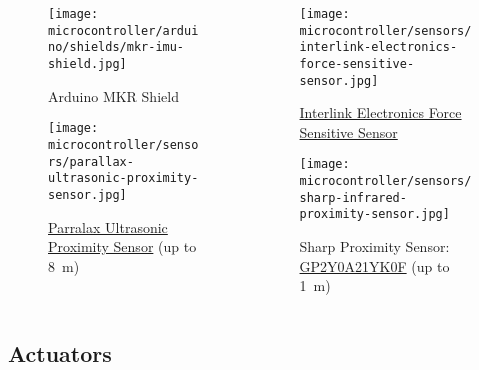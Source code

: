 \documentclass[aspectratio=169]{beamer}
\begin{document}
\begin{frame}
    \begin{columns}
        \begin{column}{0.5\textwidth}
            \begin{figure}
                \texttt{[image: microcontroller/arduino/shields/mkr-imu-shield.jpg]}
                \caption{Arduino\textregistered{} MKR  Shield}
            \end{figure}
            \begin{figure}
                \texttt{[image: microcontroller/sensors/parallax-ultrasonic-proximity-sensor.jpg]}
                \caption{\href{https://www.parallax.com/product/ping-ultrasonic-distance-sensor/}{Parralax Ultrasonic Proximity Sensor} (up to \SI{8}{\meter})}
            \end{figure}
        \end{column}
        \begin{column}{0.5\textwidth}
            \begin{figure}
                \texttt{[image: microcontroller/sensors/interlink-electronics-force-sensitive-sensor.jpg]}
                \caption{\href{https://cdn.sparkfun.com/assets/8/a/1/2/0/2010-10-26-DataSheet-FSR402-Layout2.pdf}{Interlink Electronics Force Sensitive Sensor}}
            \end{figure}
            \begin{figure}
                \texttt{[image: microcontroller/sensors/sharp-infrared-proximity-sensor.jpg]}
                \caption{Sharp  Proximity Sensor: \href{https://global.sharp/products/device/lineup/data/pdf/datasheet/gp2y0a21yk\_e.pdf}{GP2Y0A21YK0F} (up to \SI{1}{\meter})}
            \end{figure}
        \end{column}
    \end{columns}
\end{frame}

\subsection{Actuators}
\end{document}
